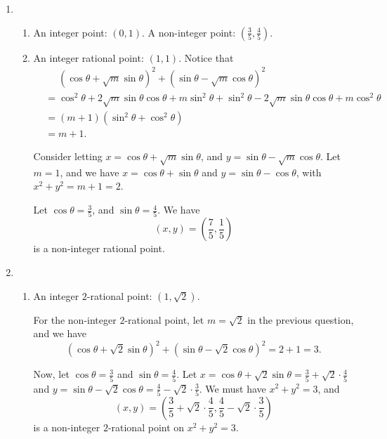 \Question{\currfilebase}

\begin{enumerate}
    \item \begin{enumerate}
              \item An integer point: \((0, 1)\). A non-integer point: \(\left(\frac{3}{5}, \frac{4}{5}\right)\).
              \item An integer rational point: \((1, 1)\). Notice that
                    \begin{align*}
                         & \phantom{=} (\cos \theta + \sqrt{m} \sin \theta)^2 + (\sin \theta - \sqrt{m} \cos \theta)^2                                   \\
                         & = \cos^2\theta + 2\sqrt{m} \sin\theta\cos\theta + m\sin^2\theta + \sin^2\theta -2\sqrt{m}\sin\theta\cos\theta + m\cos^2\theta \\
                         & = (m + 1) (\sin^2\theta + \cos^2\theta)                                                                                       \\
                         & = m + 1.
                    \end{align*}

                    Consider letting \(x = \cos \theta + \sqrt{m} \sin \theta\), and \(y = \sin \theta - \sqrt{m} \cos \theta\). Let \(m = 1\), and we have \(x = \cos \theta + \sin \theta\) and \(y = \sin \theta - \cos \theta\), with \(x^2 + y^2 = m + 1 = 2\).

                    Let \(\cos \theta = \frac{3}{5}\), and \(\sin \theta = \frac{4}{5}\). We have
                    \[
                        (x, y) = \left(\frac{7}{5}, \frac{1}{5}\right)
                    \]
                    is a non-integer rational point.
          \end{enumerate}

    \item \begin{enumerate}
              \item An integer \(2\)-rational point: \((1, \sqrt{2})\).

                    For the non-integer \(2\)-rational point, let \(m = \sqrt{2}\) in the previous question, and we have
                    \[
                        (\cos \theta + \sqrt{2} \sin \theta)^2 + (\sin \theta - \sqrt{2} \cos \theta)^2 = 2 + 1 = 3.
                    \]

                    Now, let \(\cos \theta = \frac{3}{5}\) and \(\sin \theta = \frac{4}{5}\). Let \(x = \cos \theta + \sqrt{2} \sin \theta = \frac{3}{5} + \sqrt{2} \cdot \frac{4}{5}\) and \(y = \sin \theta - \sqrt{2} \cos \theta = \frac{4}{5} - \sqrt{2} \cdot \frac{3}{5}\). We must have \(x^2 + y^2 = 3\), and
                    \[
                        (x, y) = \left(\frac{3}{5} + \sqrt{2} \cdot \frac{4}{5}, \frac{4}{5} - \sqrt{2} \cdot \frac{3}{5}\right)
                    \]
                    is a non-integer \(2\)-rational point on \(x^2 + y^2 = 3\).


\end{enumerate}
\end{enumerate}
